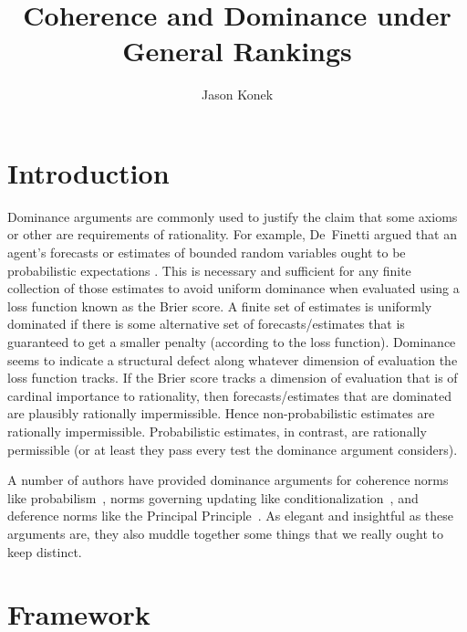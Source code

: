 \documentclass[11pt]{article}
\title{Coherence and Dominance under General Rankings}
\author{Jason Konek}
\date{}
\theoremstyle{definition}
\theoremstyle{remark}
\begin{document}
\maketitle





\section{Introduction}\label{sec:intro}


Dominance arguments are commonly used to justify the claim that some axioms or other are requirements of rationality. For example, De~Finetti argued that an agent's forecasts or estimates of bounded random variables ought to be probabilistic expectations \cite[\S1.6, \S3.3]{deFinetti1974}. This is necessary and sufficient for any finite collection of those estimates to avoid uniform dominance when evaluated using a loss function known as the Brier score. A finite set of estimates is uniformly dominated if there is some alternative set of forecasts/estimates that is guaranteed to get a smaller penalty (according to the loss function). Dominance seems to indicate a structural defect along whatever dimension of evaluation the loss function tracks. If the Brier score tracks a dimension of evaluation that is of cardinal importance to rationality, then forecasts/estimates that are dominated are plausibly rationally impermissible. Hence non-probabilistic estimates are rationally impermissible. Probabilistic estimates, in contrast, are rationally permissible (or at least they pass every test the dominance argument considers).


A number of authors have provided dominance arguments for coherence norms like probabilism~\cite{Joyce2009,Predd2009,SSK2009,Pettigrew2022,Nielsen2023}, norms governing updating like conditionalization~\cite{Briggs2020,Nielsen2021}, and deference norms like the Principal Principle~\cite[Chapter~10]{Pettigrew2016}. As elegant and insightful as these arguments are, they also muddle together some things that we really ought to keep distinct.



\section{Framework}\label{sec:framework}
\end{document}
